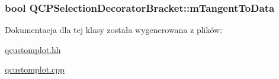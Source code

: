 \subsubsection[{\texorpdfstring{m\+Tangent\+To\+Data}{mTangentToData}}]{\setlength{\rightskip}{0pt plus 5cm}bool Q\+C\+P\+Selection\+Decorator\+Bracket\+::m\+Tangent\+To\+Data\hspace{0.3cm}{\ttfamily [protected]}}\hypertarget{class_q_c_p_selection_decorator_bracket_ac08c7de0fd81b64b0f3fe31739688081}{}\label{class_q_c_p_selection_decorator_bracket_ac08c7de0fd81b64b0f3fe31739688081}


Dokumentacja dla tej klasy została wygenerowana z plików\+:\begin{DoxyCompactItemize}
\item 
\hyperlink{qcustomplot_8hh}{qcustomplot.\+hh}\item 
\hyperlink{qcustomplot_8cpp}{qcustomplot.\+cpp}\end{DoxyCompactItemize}
